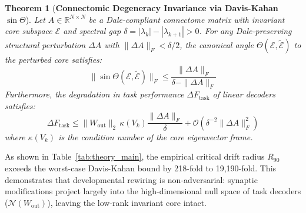 \documentclass[10pt,twocolumn,letterpaper]{article}
\newtheorem{theorem}{Theorem}
\begin{document}
\begin{theorem}[\textbf{Connectomic Degeneracy Invariance via Davis-Kahan $\sin\Theta$}]
Let $A \in \mathbb{R}^{N \times N}$ be a Dale-compliant connectome matrix with invariant core subspace $\mathcal{E}$ and spectral gap $\delta = |\lambda_k| - |\lambda_{k+1}| > 0$. For any Dale-preserving structural perturbation $\Delta A$ with $\|\Delta A\|_F < \delta / 2$, the canonical angle $\Theta(\mathcal{E}, \tilde{\mathcal{E}})$ to the perturbed core satisfies:
\begin{equation}
\|\sin\Theta(\mathcal{E}, \tilde{\mathcal{E}})\|_F \le \frac{\|\Delta A\|_F}{\delta - \|\Delta A\|_F}
\end{equation}
Furthermore, the degradation in task performance $\Delta F_{\mathrm{task}}$ of linear decoders satisfies:
\begin{equation}
\Delta F_{\mathrm{task}} \le \|W_{\mathrm{out}}\|_2 \, \kappa(V_k) \frac{\|\Delta A\|_F}{\delta} + \mathcal{O}\left( \delta^{-2}\|\Delta A\|_F^2 \right)
\end{equation}
where $\kappa(V_k)$ is the condition number of the core eigenvector frame.
\end{theorem}

\begin{table}[t]
\centering
\small
\caption{\textbf{Theoretical Invariance Bounds vs Empirical $R_{90}$ Across 4 Phyla.}}
\label{tab:theory_main}
\end{table}

As shown in Table~\ref{tab:theory_main}, the empirical critical drift radius $R_{90}$ exceeds the worst-case Davis-Kahan bound by 218-fold to 19,190-fold. This demonstrates that developmental rewiring is non-adversarial: synaptic modifications project largely into the high-dimensional null space of task decoders ($\mathcal{N}(W_{\mathrm{out}})$), leaving the low-rank invariant core intact.
\end{document}
